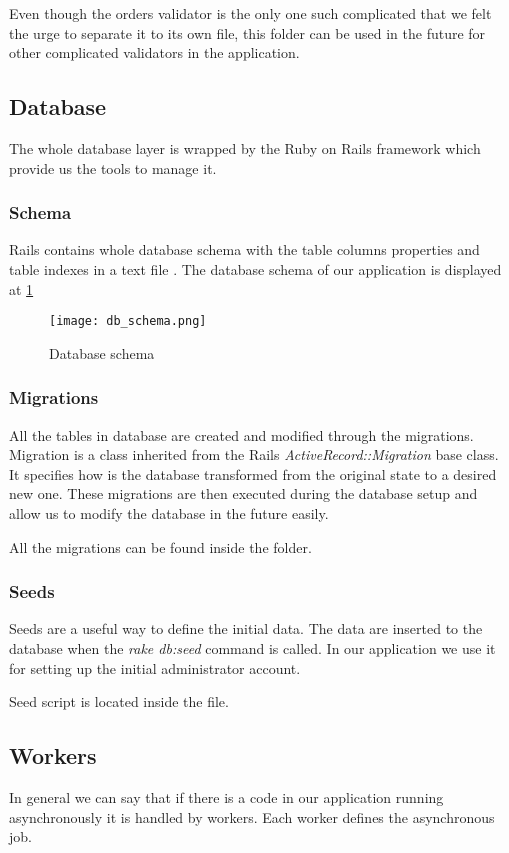 		Even though the orders validator is the only one such complicated that we felt the urge to separate it to its own file, this folder can be used in the future for other complicated validators in the application.
	
	\subsection{Database}
		The whole database layer is wrapped by the Ruby on Rails framework which provide us the tools to manage it.
		
		\subsubsection{Schema}
			Rails contains whole database schema with the table columns properties and table indexes in a text file . The database schema of our application is displayed at \ref{database-schema} 	
			\begin{figure}[h]\centering
				\texttt{[image: db\_schema.png]}
				\caption{Database schema} 
				\label{database-schema}
			\end{figure} 
		
		\subsubsection{Migrations}
			All the tables in database are created and modified through the migrations. Migration is a class inherited from the Rails \textit{ActiveRecord::Migration} base class. It specifies how is the database transformed from the original state to a desired new one. These migrations are then executed during the database setup and allow us to modify the database in the future easily.
			
		All the migrations can be found inside the  folder.
		\subsubsection{Seeds}
			Seeds are a useful way to define the initial data. The data are inserted to the database when the \textit{rake db:seed} command is called. In our application we use it for setting up the initial administrator account.
			
			Seed script is located inside the  file.
	
	\subsection{Workers}
		In general we can say that if there is a code in our application running asynchronously it is handled by workers. Each worker defines the asynchronous job. 
		
